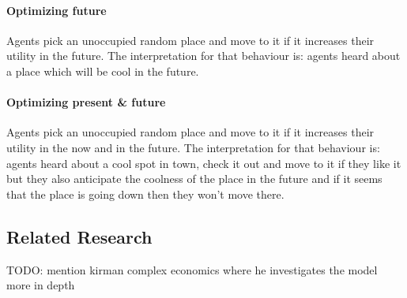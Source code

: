 \paragraph{Optimizing future} Agents pick an unoccupied random place and move to it if it increases their utility in the future. The interpretation for that behaviour is: agents heard about a place which will be cool in the future.

\paragraph{Optimizing present \& future} Agents pick an unoccupied random place and move to it if it increases their utility in the now and in the future. The interpretation for that behaviour is: agents heard about a cool spot in town, check it out and move to it if they like it but they also anticipate the coolness of the place in the future and if it seems that the place is going down then they won't move there.

\subsection{Related Research}
TODO: \cite{kirman_complex_2010} mention kirman complex economics where he investigates the model more in depth
